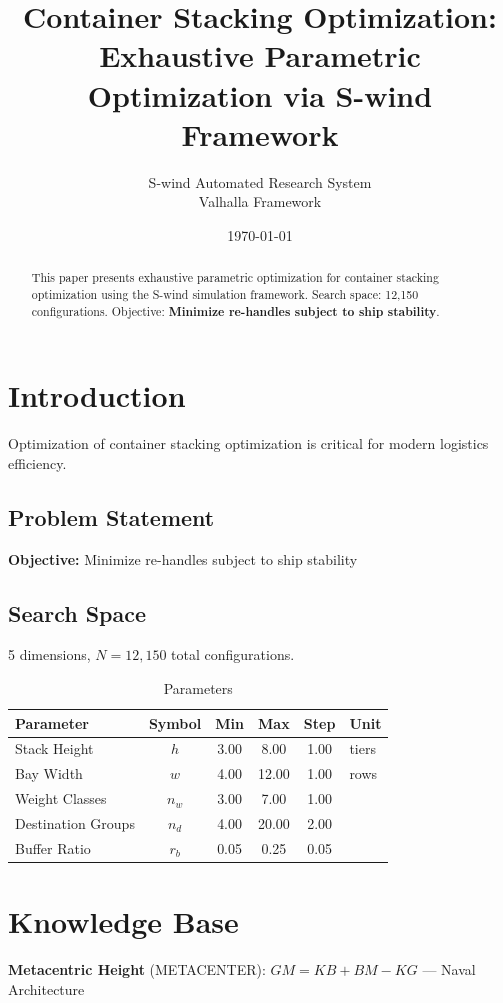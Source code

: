 \documentclass[11pt,twocolumn]{article}
\title{Container Stacking Optimization: \\Exhaustive Parametric Optimization via S-wind Framework}
\author{S-wind Automated Research System\\Valhalla Framework}
\date{\today}
\begin{document}
\maketitle

\begin{abstract}
This paper presents exhaustive parametric optimization for container stacking optimization using the S-wind simulation framework.
Search space: 12,150 configurations. Objective: \textbf{Minimize re-handles subject to ship stability}.
\end{abstract}

\section{Introduction}
Optimization of container stacking optimization is critical for modern logistics efficiency.

\subsection{Problem Statement}
\textbf{Objective:} Minimize re-handles subject to ship stability

\subsection{Search Space}
5 dimensions, $N = 12,150$ total configurations.

\begin{table}[h]
\centering
\caption{Parameters}
\begin{tabular}{@{}lccccl@{}}
\toprule
Parameter & Symbol & Min & Max & Step & Unit \\
\midrule
Stack Height & $h$ & 3.00 & 8.00 & 1.00 & tiers \\
Bay Width & $w$ & 4.00 & 12.00 & 1.00 & rows \\
Weight Classes & $n_w$ & 3.00 & 7.00 & 1.00 &  \\
Destination Groups & $n_d$ & 4.00 & 20.00 & 2.00 &  \\
Buffer Ratio & $r_b$ & 0.05 & 0.25 & 0.05 &  \\
\bottomrule
\end{tabular}
\end{table}

\section{Knowledge Base}
\textbf{Metacentric Height} (METACENTER): $GM = KB + BM - KG$ --- Naval Architecture
\end{document}
